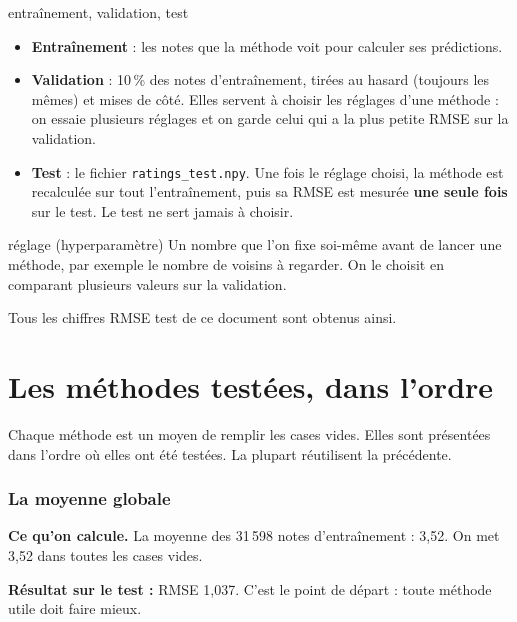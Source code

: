 \documentclass[11pt,a4paper]{article}
\newcommand{\resultat}[1]{\par\textbf{Résultat sur le test :} #1\par}
\begin{document}
\begin{definition}{entraînement, validation, test}
\begin{itemize}[leftmargin=*]
  \item \textbf{Entraînement} : les notes que la méthode voit pour calculer ses prédictions.
  \item \textbf{Validation} : 10\,\% des notes d'entraînement, tirées au hasard (toujours
        les mêmes) et mises de côté. Elles servent à choisir les réglages d'une méthode :
        on essaie plusieurs réglages et on garde celui qui a la plus petite RMSE sur
        la validation.
  \item \textbf{Test} : le fichier \texttt{ratings\_test.npy}. Une fois le réglage choisi,
        la méthode est recalculée sur tout l'entraînement, puis sa RMSE est mesurée
        \textbf{une seule fois} sur le test. Le test ne sert jamais à choisir.
\end{itemize}
\end{definition}

\begin{definition}{réglage (hyperparamètre)}
Un nombre que l'on fixe soi-même avant de lancer une méthode, par exemple le nombre de
voisins à regarder. On le choisit en comparant plusieurs valeurs sur la validation.
\end{definition}

Tous les chiffres \og RMSE test \fg{} de ce document sont obtenus ainsi.

\part{Les méthodes testées, dans l'ordre}

Chaque méthode est un moyen de remplir les cases vides. Elles sont présentées dans
l'ordre où elles ont été testées. La plupart réutilisent la précédente.

\section{La moyenne globale}

\textbf{Ce qu'on calcule.} La moyenne des 31\,598 notes d'entraînement : 3,52. On met
3,52 dans toutes les cases vides.

\resultat{RMSE 1,037. C'est le point de départ : toute méthode utile doit faire mieux.}
\end{document}
